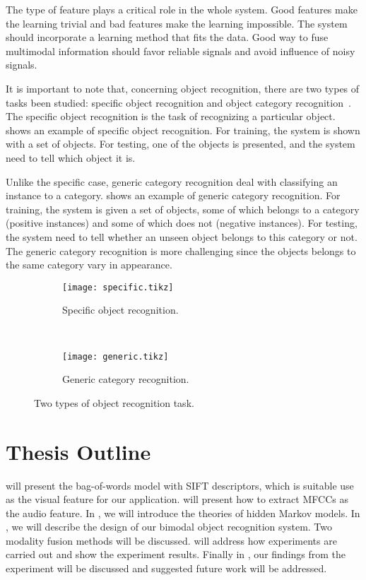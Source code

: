 \documentclass[12pt,final,twoside]{report}
\begin{document}
 The type of feature plays a critical role in the whole system. Good features make the learning trivial and bad features make the learning impossible.
 The system should incorporate a learning method that fits the data.
Good way to fuse multimodal information should favor reliable signals and avoid influence of noisy signals.

It is important to note that, concerning object recognition, there are two types of tasks been studied: specific object recognition and object category recognition~\cite{grauman_visual_2011}. The specific object recognition is the task of recognizing a particular object.  shows an example of specific object recognition. For training, the system is shown with a set of objects. For testing, one of the objects is presented, and the system need to tell which object it is.

Unlike the specific case, generic category recognition deal with classifying an instance to a category.  shows an example of generic category recognition. For training, the system is given a set of objects, some of which belongs to a category (positive instances) and some of which does not (negative instances). For testing, the system need to tell whether an unseen object belongs to this category or not. The generic category recognition is more challenging since the objects belongs to the same category vary in appearance.

\begin{figure}[t]
  \centering
  \begin{subfigure}[b]{.9\textwidth}
    \texttt{[image: specific.tikz]}
    \caption{Specific object recognition.}
    \label{fig:specific}
  \end{subfigure}

  ~

  \begin{subfigure}[b]{.9\textwidth}
    \texttt{[image: generic.tikz]}
    \caption{Generic category recognition.}
    \label{fig:generic}
  \end{subfigure}

  \caption{Two types of object recognition task.}
\end{figure}

\section{Thesis Outline}
 will present the bag-of-words model with SIFT descriptors, which is suitable use as the visual feature for our application.
 will present how to extract MFCCs as the audio feature.  
In , we will introduce the theories of hidden Markov models.  
In , we will describe the design of our bimodal object recognition system. Two modality fusion methods will be discussed.  
 will address how experiments are carried out and show the experiment results.  
Finally in , our findings from the experiment will be discussed and suggested future work will be addressed.
\end{document}
